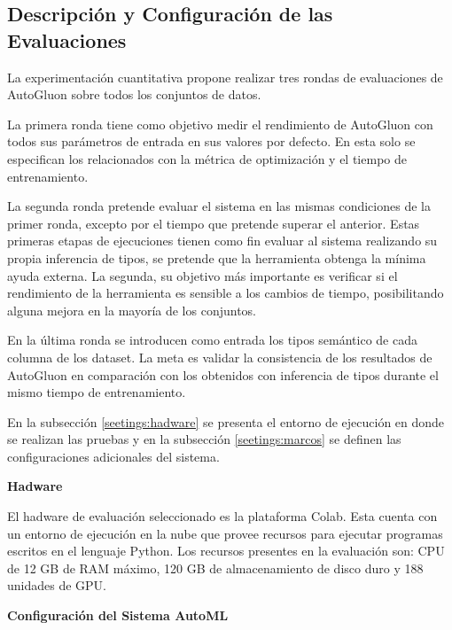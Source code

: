 \subsection{Descripción y Configuración de las Evaluaciones}\label{subsection:seetings}

La experimentación cuantitativa propone realizar tres rondas de evaluaciones de AutoGluon sobre todos los conjuntos de datos.

La primera ronda tiene como objetivo medir el rendimiento de AutoGluon con todos sus parámetros de entrada en sus valores por defecto. En esta solo se especifican los 
relacionados con la métrica de optimización y el tiempo de entrenamiento. 

La segunda ronda pretende evaluar el sistema en las mismas condiciones de la primer ronda, excepto por el tiempo que pretende superar el anterior.
Estas primeras etapas de ejecuciones tienen como fin evaluar al sistema realizando su propia inferencia de tipos, se pretende que la herramienta obtenga la mínima
ayuda externa. La segunda, su objetivo más importante es verificar si el rendimiento de la herramienta es sensible a los cambios de tiempo, posibilitando alguna 
mejora en la mayoría de los conjuntos.

En la última ronda se introducen como entrada los tipos semántico de cada columna de los dataset. La meta es validar la consistencia de los resultados de AutoGluon en 
comparación con los obtenidos con inferencia de tipos durante el mismo tiempo de entrenamiento. 

En la subsección \ref{seetings:hadware} se presenta el entorno de ejecución en donde se realizan las pruebas y en la subsección \ref{seetings:marcos} se definen las 
configuraciones adicionales del sistema. 

\begin{flushleft} 
  { \textbf{Hadware}}\label{seetings:hadware}
\end{flushleft}

El hadware de evaluación seleccionado es la plataforma Colab. Esta cuenta con un entorno de ejecución en la nube que provee recursos para ejecutar programas 
escritos en el lenguaje Python. Los recursos presentes en la evaluación son: CPU de 12 GB de RAM máximo, 120 GB de almacenamiento de disco duro y 188 unidades de GPU.


\begin{flushleft} 
  { \textbf{Configuración del Sistema AutoML}}\label{seetings:marcos}
\end{flushleft}

